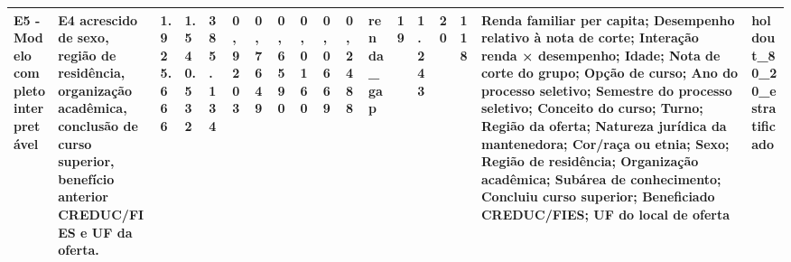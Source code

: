 \begin{table}
\begin{tabular}{llllllllllllllllll}
E5 - Modelo completo interpretável & E4 acrescido de sexo, região de residência, organização acadêmica, conclusão de curso superior, benefício anterior CREDUC/FIES e UF da oferta. & 1.925.666 & 1.540.532 & 385.134 & 0,9203 & 0,7649 & 0,6590 & 0,0160 & 0,0669 & 0,2488 & renda\_gap & 19 & 1.243 & 20 & 118 & Renda familiar per capita; Desempenho relativo à nota de corte; Interação renda × desempenho; Idade; Nota de corte do grupo; Opção de curso; Ano do processo seletivo; Semestre do processo seletivo; Conceito do curso; Turno; Região da oferta; Natureza jurídica da mantenedora; Cor/raça ou etnia; Sexo; Região de residência; Organização acadêmica; Subárea de conhecimento; Concluiu curso superior; Beneficiado CREDUC/FIES; UF do local de oferta & holdout\_80\_20\_estratificado \\
\bottomrule
\end{tabular}
\end{table}
